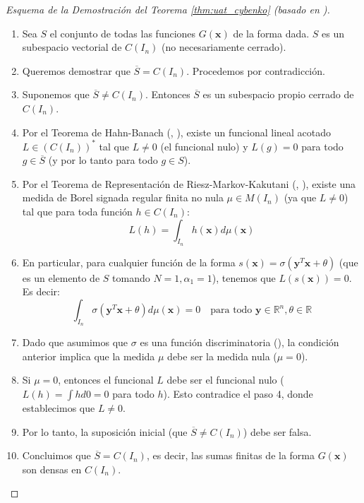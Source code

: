 \begin{proof}[Esquema de la Demostración del Teorema \ref{thm:uat_cybenko} (basado en \citet{Cybenko1989})]
    \begin{enumerate}
        \item Sea $S$ el conjunto de todas las funciones $G(\mathbf{x})$ de la forma dada. $S$ es un subespacio vectorial de $C(I_n)$ (no necesariamente cerrado).
        \item Queremos demostrar que $\overline{S} = C(I_n)$. Procedemos por contradicción.
        \item Suponemos que $\overline{S} \neq C(I_n)$. Entonces $\overline{S}$ es un subespacio propio cerrado de $C(I_n)$.
        \item Por el Teorema de Hahn-Banach (, \citealt{Kreyszig1989}), existe un funcional lineal acotado $L \in (C(I_n))^*$ tal que $L \neq 0$ (el funcional nulo) y $L(g) = 0$ para todo $g \in \overline{S}$ (y por lo tanto para todo $g \in S$).
        \item Por el Teorema de Representación de Riesz-Markov-Kakutani (, \citealt{Rudin1987}), existe una medida de Borel signada regular finita no nula $\mu \in M(I_n)$ (ya que $L \neq 0$) tal que para toda función $h \in C(I_n)$:
        \[ L(h) = \int_{I_n} h(\mathbf{x}) d\mu(\mathbf{x}) \]
        \item En particular, para cualquier función de la forma $s(\mathbf{x}) = \sigma(\mathbf{y}^T \mathbf{x} + \theta)$ (que es un elemento de $S$ tomando $N=1, \alpha_1=1$), tenemos que $L(s(\mathbf{x})) = 0$. Es decir:
        \[ \int_{I_n} \sigma(\mathbf{y}^T \mathbf{x} + \theta) d\mu(\mathbf{x}) = 0 \quad \text{para todo } \mathbf{y} \in \mathbb{R}^n, \theta \in \mathbb{R} \]
        \item Dado que asumimos que $\sigma$ es una función discriminatoria (), la condición anterior implica que la medida $\mu$ debe ser la medida nula ($\mu=0$).
        \item Si $\mu=0$, entonces el funcional $L$ debe ser el funcional nulo ($L(h) = \int h d0 = 0$ para todo $h$). Esto contradice el paso 4, donde establecimos que $L \neq 0$.
        \item Por lo tanto, la suposición inicial (que $\overline{S} \neq C(I_n)$) debe ser falsa.
        \item Concluimos que $\overline{S} = C(I_n)$, es decir, las sumas finitas de la forma $G(\mathbf{x})$ son densas en $C(I_n)$.
    \end{enumerate}
\end{proof}

